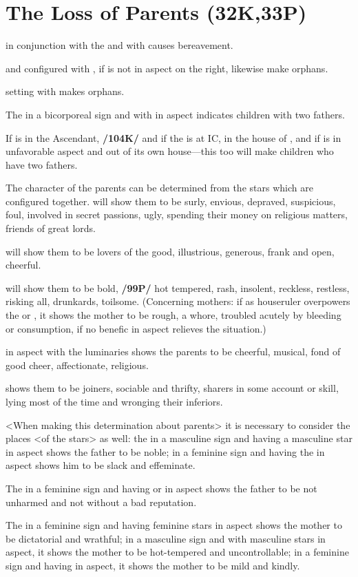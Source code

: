 \section{The Loss of Parents (32K,33P)}

\Mars\xspace in conjunction with the \Sun\xspace and \Square\xspace with \Saturn\xspace causes bereavement. 

\Saturn\xspace and \Mars\xspace configured with \Mercury, if \Jupiter\xspace is not in aspect on the right, likewise make orphans. 

\Saturn\xspace setting with \Jupiter\xspace makes orphans. 

The \Moon\xspace in a bicorporeal sign and with \Jupiter\xspace in aspect indicates children with two fathers. 

If \Venus\xspace is in the Ascendant, \textbf{/104K/} and if the \Moon\xspace is at IC, in the house of \Mars, and if \Jupiter\xspace is in unfavorable aspect and out of its own house—this too will make children who have two fathers.

The character of the parents can be determined from the stars which are configured together. \Saturn\xspace will show them to be surly, envious, depraved, suspicious, foul, involved in secret passions, ugly, spending their money on religious matters, friends of great lords. 

\Jupiter\xspace will show them to be lovers of the good, illustrious, generous, frank and open, cheerful. 

\Mars\xspace will show them to be bold, \textbf{/99P/} hot tempered, rash, insolent, reckless, restless, risking all, drunkards, toilsome. (Concerning mothers: if \Mars\xspace
as houseruler overpowers the \Moon\xspace or \Venus, it shows the mother to be rough, a whore, troubled acutely by bleeding or consumption, if no benefic in aspect relieves the situation.) 

\Venus\xspace in aspect with the luminaries shows the parents to be cheerful, musical, fond of good cheer, affectionate, religious. 

\Mercury\xspace shows them to be joiners, sociable and thrifty, sharers in some account or skill, lying most of the time and
wronging their inferiors.

<When making this determination about parents> it is necessary to consider the places <of the stars>
as well: the \Sun\xspace in a masculine sign and having a masculine star in aspect shows the father to be noble; in a
feminine sign and having the \Moon\xspace in aspect shows him to be slack and effeminate. 

The \Sun\xspace in a feminine sign and having \Saturn\xspace or \Venus\xspace in aspect shows the father to be not unharmed and not without a bad reputation. 

The \Moon\xspace in a feminine sign and having feminine stars in aspect shows the mother to be dictatorial and wrathful; in a masculine sign and with masculine stars in aspect, it shows the mother to be hot-tempered and uncontrollable; in a feminine sign and having \Jupiter\xspace in aspect, it shows the mother to be mild and kindly.

\newpage